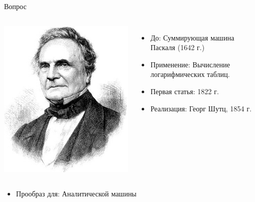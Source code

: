 \documentclass[pdf,9pt,aspectratio=169]{beamer}
\begin{document}
\begin{frame}{Вопрос}
\begin{columns}[T]
\begin{column}[T]{8cm}
\begin{exampleblock}
\begin{columns}[]
            \includegraphics[width=\textwidth]{images/CharlesBabbage.jpg}
          \column{5.7cm}
              \setlength{\leftmargini}{5pt}
            \begin{itemize}
              \item До: Суммирующая машина Паскаля (1642 г.)
              \item Применение: Вычисление логарифмических таблиц.
              \item Первая статья: 1822 г.
              \item Реализация: Георг Шутц, 1854 г.
            \end{itemize}
        \end{columns}
        \begin{itemize}
          \item Прообраз для: Аналитической машины
        \end{itemize}
      \end{exampleblock}
    \end{column}
  \end{columns}
\end{frame}
\end{document}
